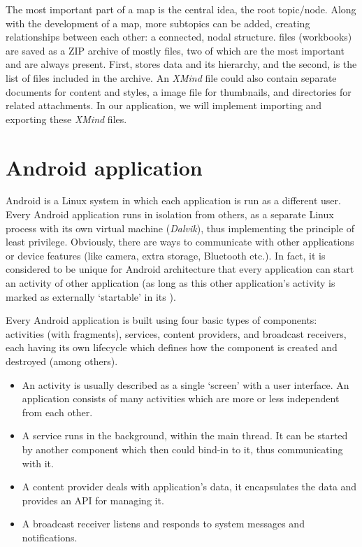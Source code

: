 The most important part of a map is the central idea, the root topic/node. Along with the development of a map, more subtopics can be added, creating relationships between each other: a connected, nodal structure.  files (workbooks) are saved as a ZIP archive of mostly  files, two of which are the most important and are always present. First,  stores data and its hierarchy, and the second,  is the list of files included in the archive. An {\em XMind} file could also contain separate  documents for content and styles, a  image file for thumbnails, and directories for related attachments. \cite{XMind:2009:Format} In our application, we will implement importing and exporting these {\em XMind} files.

\section{Android application}
\label{sec:android-theory}

Android is a Linux system in which each application is run as a different user. Every Android application runs in isolation from others, as a separate Linux process with its own virtual machine ({\em Dalvik}), thus implementing the principle of least privilege. Obviously, there are ways to communicate with other applications or device features (like camera, extra storage, Bluetooth etc.). In fact, it is considered to be unique for Android architecture that every application can start an activity of other application (as long as this other application's activity is marked as externally `startable' in its ).

Every Android application is built using four basic types of components: activities (with fragments), services, content providers, and broadcast receivers, each having its own lifecycle which defines how the component is created and destroyed (among others).

\begin{itemize}
	\item An activity is usually described as a single `screen' with a user interface. An application consists of many activities which are more or less independent from each other.
	\item A service runs in the background, within the main thread. It can be started by another component which then could bind-in to it, thus communicating with it.
	\item A content provider deals with application's data, it encapsulates the data and provides an API for managing it.
	\item A broadcast receiver listens and responds to system messages and notifications.
\end{itemize}

